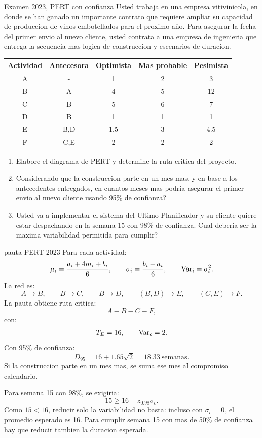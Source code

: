 \begin{enunciado}{Examen 2023, PERT con confianza}
Usted trabaja en una empresa vitivinicola, en donde se han ganado un importante contrato que requiere ampliar su capacidad de produccion de vinos embotellados para el proximo año. Para asegurar la fecha del primer envio al nuevo cliente, usted contrata a una empresa de ingenieria que entrega la secuencia mas logica de construccion y escenarios de duracion.

\begin{center}
\begin{tabular}{c|c|ccc}
\toprule
Actividad & Antecesora & Optimista & Mas probable & Pesimista\\
\midrule
A & - & 1 & 2 & 3\\
B & A & 4 & 5 & 12\\
C & B & 5 & 6 & 7\\
D & B & 1 & 1 & 1\\
E & B,D & 1.5 & 3 & 4.5\\
F & C,E & 2 & 2 & 2\\
\bottomrule
\end{tabular}
\end{center}

\begin{enumerate}[label=\alph*)]
  \item Elabore el diagrama de PERT y determine la ruta critica del proyecto.
  \item Considerando que la construccion parte en un mes mas, y en base a los antecedentes entregados, en cuantos meses mas podria asegurar el primer envio al nuevo cliente usando 95\% de confianza?
  \item Usted va a implementar el sistema del Ultimo Planificador y su cliente quiere estar despachando en la semana 15 con 98\% de confianza. Cual deberia ser la maxima variabilidad permitida para cumplir?
\end{enumerate}
\end{enunciado}

\begin{pautacompleta}{pauta PERT 2023}
Para cada actividad:
\[
  \mu_i=\frac{a_i+4m_i+b_i}{6},\qquad
  \sigma_i=\frac{b_i-a_i}{6},\qquad
  \operatorname{Var}_i=\sigma_i^2.
\]
La red es:
\[
  A\rightarrow B,\qquad B\rightarrow C,\qquad B\rightarrow D,\qquad (B,D)\rightarrow E,\qquad (C,E)\rightarrow F.
\]
La pauta obtiene ruta critica:
\[
  A-B-C-F,
\]
con:
\[
  T_E=16,\qquad \operatorname{Var}_c=2.
\]
Con 95\% de confianza:
\[
  D_{95}=16+1.65\sqrt{2}=18.33\ \text{semanas}.
\]
Si la construccion parte en un mes mas, se suma ese mes al compromiso calendario.

Para semana 15 con 98\%, se exigiria:
\[
  15\geq 16+z_{0.98}\sigma_c.
\]
Como $15<16$, reducir solo la variabilidad no basta: incluso con $\sigma_c=0$, el promedio esperado es 16. Para cumplir semana 15 con mas de 50\% de confianza hay que reducir tambien la duracion esperada.
\end{pautacompleta}


